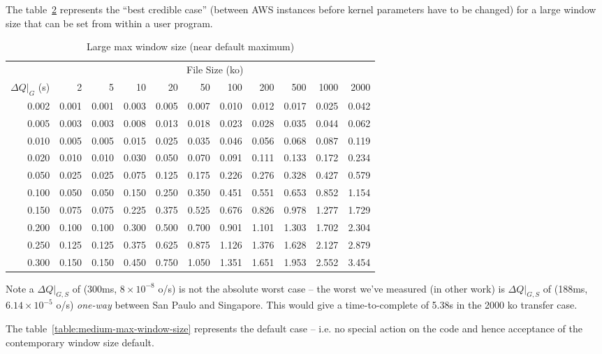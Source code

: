 \documentclass[11pt,a4paper]{article}
\begin{document}
The table~\ref{table:large-max-window-size} represents the ``best credible
case'' (between AWS instances before kernel parameters have to be changed) for
a large window size that can be set from within a user program.

\begin{table}
\begin{longtable}[]{r|rrrrrrrrrr}
\toprule
  \caption{Large max window size (near default maximum)}
  \label{table:large-max-window-size}
  \tabularnewline
\midrule
                   & \multicolumn{10}{c}{File Size (ko)} \tabularnewline
$\Delta{}Q|_G$ (s) & 2 & 5 & 10 & 20 & 50 & 100 & 200 & 500 & 1000 & 2000\tabularnewline
\midrule
\endhead
0.002 & 0.001 & 0.001 & 0.003 & 0.005 & 0.007 & 0.010 & 0.012 & 0.017 &
0.025 & 0.042\tabularnewline
0.005 & 0.003 & 0.003 & 0.008 & 0.013 & 0.018 & 0.023 & 0.028 & 0.035 &
0.044 & 0.062\tabularnewline
0.010 & 0.005 & 0.005 & 0.015 & 0.025 & 0.035 & 0.046 & 0.056 & 0.068 &
0.087 & 0.119\tabularnewline
0.020 & 0.010 & 0.010 & 0.030 & 0.050 & 0.070 & 0.091 & 0.111 & 0.133 &
0.172 & 0.234\tabularnewline
0.050 & 0.025 & 0.025 & 0.075 & 0.125 & 0.175 & 0.226 & 0.276 & 0.328 &
0.427 & 0.579\tabularnewline
0.100 & 0.050 & 0.050 & 0.150 & 0.250 & 0.350 & 0.451 & 0.551 & 0.653 &
0.852 & 1.154\tabularnewline
0.150 & 0.075 & 0.075 & 0.225 & 0.375 & 0.525 & 0.676 & 0.826 & 0.978 &
1.277 & 1.729\tabularnewline
0.200 & 0.100 & 0.100 & 0.300 & 0.500 & 0.700 & 0.901 & 1.101 & 1.303 &
1.702 & 2.304\tabularnewline
0.250 & 0.125 & 0.125 & 0.375 & 0.625 & 0.875 & 1.126 & 1.376 & 1.628 &
2.127 & 2.879\tabularnewline
0.300 & 0.150 & 0.150 & 0.450 & 0.750 & 1.050 & 1.351 & 1.651 & 1.953 &
2.552 & 3.454\tabularnewline
\bottomrule
\end{longtable}
\end{table}

Note a $\Delta{}Q|_{G,S}$ of (300ms, $8\times{}10^{-8}$ o/s) is not the
absolute worst case -- the worst we've measured (in other work) is
$\Delta{}Q|_{G,S}$ of (188ms, $6.14\times{}10^{-5}$ o/s) \emph{one-way}
between San Paulo and Singapore. This would give a time-to-complete of
5.38s in the 2000 ko transfer case.

The table~\ref{table:medium-max-window-size} represents the default case -- i.e. no special action on
the code and hence acceptance of the contemporary window size default.
\end{document}
